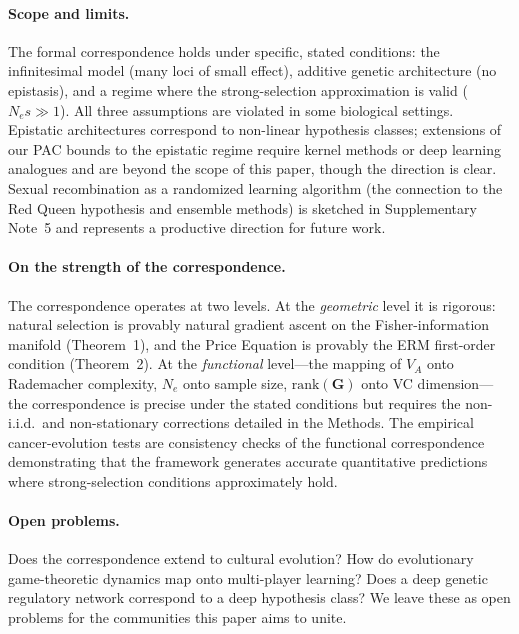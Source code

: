 \documentclass[12pt]{article}
\theoremstyle{remark}
\begin{document}
\paragraph{Scope and limits.} The formal correspondence holds under specific, stated conditions: the infinitesimal model (many loci of small effect), additive genetic architecture (no epistasis), and a regime where the strong-selection approximation is valid ($N_e s \gg 1$). All three assumptions are violated in some biological settings. Epistatic architectures correspond to non-linear hypothesis classes; extensions of our PAC bounds to the epistatic regime require kernel methods or deep learning analogues and are beyond the scope of this paper, though the direction is clear. Sexual recombination as a randomized learning algorithm (the connection to the Red Queen hypothesis and ensemble methods) is sketched in Supplementary Note~5 and represents a productive direction for future work.

\paragraph{On the strength of the correspondence.} The correspondence operates at two levels. At the \emph{geometric} level it is rigorous: natural selection is provably natural gradient ascent on the Fisher-information manifold (Theorem~1), and the Price Equation is provably the ERM first-order condition (Theorem~2). At the \emph{functional} level---the mapping of $V_A$ onto Rademacher complexity, $N_e$ onto sample size, $\mathrm{rank}(\mathbf{G})$ onto VC dimension---the correspondence is precise under the stated conditions but requires the non-i.i.d.\ and non-stationary corrections detailed in the Methods. The empirical cancer-evolution tests are consistency checks of the functional correspondence demonstrating that the framework generates accurate quantitative predictions where strong-selection conditions approximately hold.

\paragraph{Open problems.} Does the correspondence extend to cultural evolution? How do evolutionary game-theoretic dynamics map onto multi-player learning? Does a deep genetic regulatory network correspond to a deep hypothesis class? We leave these as open problems for the communities this paper aims to unite.

\end{document}
